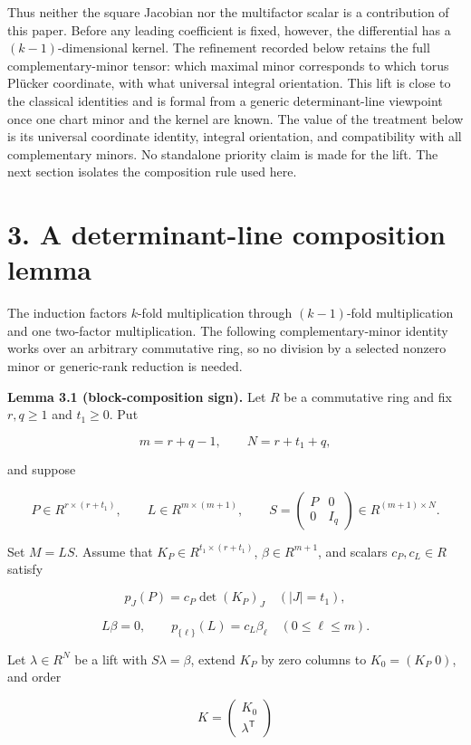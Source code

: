 \documentclass[
  11pt,
  a4paper,
]{article}
\begin{document}
Thus neither the square Jacobian nor the multifactor scalar is a
contribution of this paper. Before any leading coefficient is fixed,
however, the differential has a \((k-1)\)-dimensional kernel. The
refinement recorded below retains the full complementary-minor tensor:
which maximal minor corresponds to which torus Plücker coordinate, with
what universal integral orientation. This lift is close to the classical
identities and is formal from a generic determinant-line viewpoint once
one chart minor and the kernel are known. The value of the treatment
below is its universal coordinate identity, integral orientation, and
compatibility with all complementary minors. No standalone priority
claim is made for the lift. The next section isolates the composition
rule used here.

\section{3. A determinant-line composition
lemma}\label{a-determinant-line-composition-lemma}

The induction factors \(k\)-fold multiplication through \((k-1)\)-fold
multiplication and one two-factor multiplication. The following
complementary-minor identity works over an arbitrary commutative ring,
so no division by a selected nonzero minor or generic-rank reduction is
needed.

\textbf{Lemma 3.1 (block-composition sign).} Let \(R\) be a commutative
ring and fix \(r,q\ge1\) and \(t_1\ge0\). Put

\[
 m=r+q-1,\qquad N=r+t_1+q,
\]

and suppose

\[
 P\in R^{r\times(r+t_1)},\qquad
 L\in R^{m\times(m+1)},\qquad
 S=\begin{pmatrix}P&0\\0&I_q\end{pmatrix}
 \in R^{(m+1)\times N}.
\]

Set \(M=LS\). Assume that \(K_P\in R^{t_1\times(r+t_1)}\),
\(\beta\in R^{m+1}\), and scalars \(c_P,c_L\in R\) satisfy

\[
 p_J(P)=c_P\det(K_P)_J\quad(|J|=t_1),
\]

\[
 L\beta=0,\qquad
 p_{\{\ell\}}(L)=c_L\beta_\ell\quad(0\le\ell\le m).
\]

Let \(\lambda\in R^N\) be a lift with \(S\lambda=\beta\), extend \(K_P\)
by zero columns to \(K_0=(K_P\;0)\), and order

\[
 K=\begin{pmatrix}K_0\\\lambda^{\mathsf T}\end{pmatrix}
\]
\end{document}
